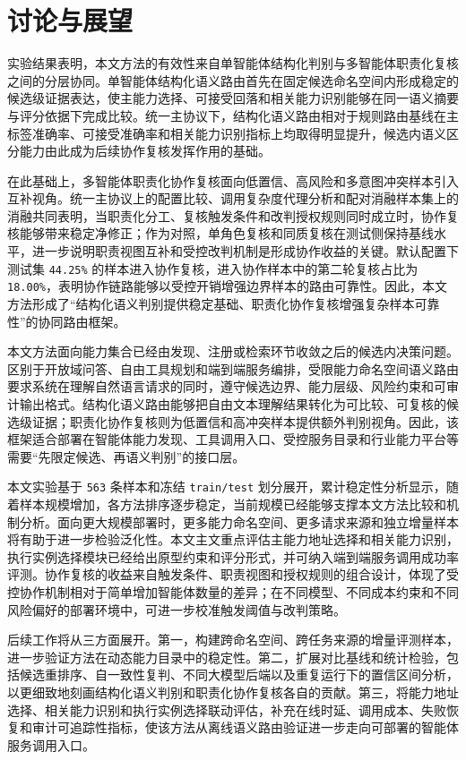 \documentclass[10pt,a4paper,twocolumn,fontset=fandol]{ctexart}
\begin{document}
\section{讨论与展望}

实验结果表明，本文方法的有效性来自单智能体结构化判别与多智能体职责化复核之间的分层协同。单智能体结构化语义路由首先在固定候选命名空间内形成稳定的候选级证据表达，使主能力选择、可接受回落和相关能力识别能够在同一语义摘要与评分依据下完成比较。统一主协议下，结构化语义路由相对于规则路由基线在主标签准确率、可接受准确率和相关能力识别指标上均取得明显提升，候选内语义区分能力由此成为后续协作复核发挥作用的基础。

在此基础上，多智能体职责化协作复核面向低置信、高风险和多意图冲突样本引入互补视角。统一主协议上的配置比较、调用复杂度代理分析和配对消融样本集上的消融共同表明，当职责化分工、复核触发条件和改判授权规则同时成立时，协作复核能够带来稳定净修正；作为对照，单角色复核和同质复核在测试侧保持基线水平，进一步说明职责视图互补和受控改判机制是形成协作收益的关键。默认配置下测试集 \texttt{44.25\%} 的样本进入协作复核，进入协作样本中的第二轮复核占比为 \texttt{18.00\%}，表明协作链路能够以受控开销增强边界样本的路由可靠性。因此，本文方法形成了“结构化语义判别提供稳定基础、职责化协作复核增强复杂样本可靠性”的协同路由框架。

本文方法面向能力集合已经由发现、注册或检索环节收敛之后的候选内决策问题。区别于开放域问答、自由工具规划和端到端服务编排，受限能力命名空间语义路由要求系统在理解自然语言请求的同时，遵守候选边界、能力层级、风险约束和可审计输出格式。结构化语义路由能够把自由文本理解结果转化为可比较、可复核的候选级证据；职责化协作复核则为低置信和高冲突样本提供额外判别视角。因此，该框架适合部署在智能体能力发现、工具调用入口、受控服务目录和行业能力平台等需要“先限定候选、再语义判别”的接口层。

本文实验基于 \texttt{563} 条样本和冻结 \texttt{train/test} 划分展开，累计稳定性分析显示，随着样本规模增加，各方法排序逐步稳定，当前规模已经能够支撑本文方法比较和机制分析。面向更大规模部署时，更多能力命名空间、更多请求来源和独立增量样本将有助于进一步检验泛化性。本文主文重点评估主能力地址选择和相关能力识别，执行实例选择模块已经给出原型约束和评分形式，并可纳入端到端服务调用成功率评测。协作复核的收益来自触发条件、职责视图和授权规则的组合设计，体现了受控协作机制相对于简单增加智能体数量的差异；在不同模型、不同成本约束和不同风险偏好的部署环境中，可进一步校准触发阈值与改判策略。

后续工作将从三方面展开。第一，构建跨命名空间、跨任务来源的增量评测样本，进一步验证方法在动态能力目录中的稳定性。第二，扩展对比基线和统计检验，包括候选重排序、自一致性复判、不同大模型后端以及重复运行下的置信区间分析，以更细致地刻画结构化语义判别和职责化协作复核各自的贡献。第三，将能力地址选择、相关能力识别和执行实例选择联动评估，补充在线时延、调用成本、失败恢复和审计可追踪性指标，使该方法从离线语义路由验证进一步走向可部署的智能体服务调用入口。
\end{document}
